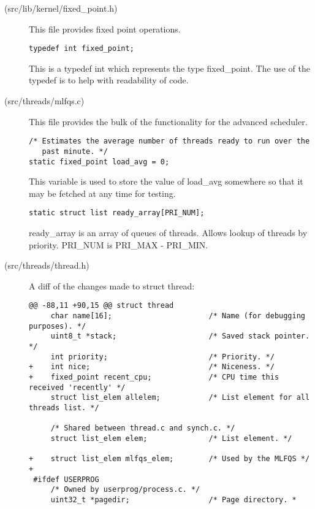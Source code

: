 \begin{description}

\item[(src/lib/kernel/fixed\_point.h)] This file provides fixed point
  operations.

\begin{verbatim}
typedef int fixed_point;
\end{verbatim}
  This is a typedef int which represents the type fixed\_point. The use
  of the typedef is to help with readability of code.

\item[(src/threads/mlfqs.c)] This file provides the bulk of the
  functionality for the advanced scheduler.

\begin{verbatim}
/* Estimates the average number of threads ready to run over the
   past minute. */
static fixed_point load_avg = 0;
\end{verbatim}

  This variable is used to store the value of load\_avg somewhere so that it may
  be fetched at any time for testing.

\begin{verbatim}
static struct list ready_array[PRI_NUM];
\end{verbatim}

  ready\_array is an array of queues of threads. Allows lookup of threads by
  priority. PRI\_NUM is PRI\_MAX - PRI\_MIN.

\item[(src/threads/thread.h)]
  A diff of the changes made to struct thread:

\begin{verbatim}
@@ -88,11 +90,15 @@ struct thread
     char name[16];                      /* Name (for debugging purposes). */
     uint8_t *stack;                     /* Saved stack pointer. */
     int priority;                       /* Priority. */
+    int nice;                           /* Niceness. */
+    fixed_point recent_cpu;             /* CPU time this received 'recently' */
     struct list_elem allelem;           /* List element for all threads list. */

     /* Shared between thread.c and synch.c. */
     struct list_elem elem;              /* List element. */

+    struct list_elem mlfqs_elem;        /* Used by the MLFQS */
+
 #ifdef USERPROG
     /* Owned by userprog/process.c. */
     uint32_t *pagedir;                  /* Page directory. *
\end{verbatim}


\end{description}
